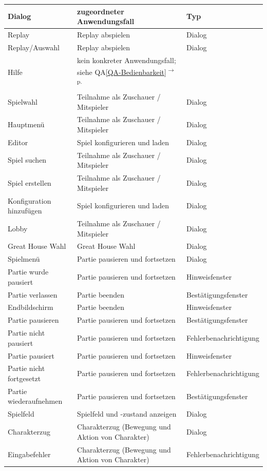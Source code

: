 \documentclass[12pt]{article}
\newcounter{fa}
\newcounter{nfa}
\newcommand{\nfaref}[1]{QA\ref{#1}\textsuperscript{$\rightarrow$ p. \pageref{#1}}}
\begin{document}
\begin{tabularx}{\linewidth}{p{4cm}|p{7cm}|l}
	\textbf{Dialog} & \textbf{zugeordneter Anwendungsfall} & Typ \\
	\hline
	Replay & Replay abspielen & Dialog \\
	Replay/Auswahl & Replay abspielen & Dialog \\
	Hilfe & kein konkreter Anwendungsfall; siehe \nfaref{QA-Bedienbarkeit} \\			Spielwahl & Teilnahme als Zuschauer / Mitspieler & Dialog \\
	Hauptmenü & Teilnahme als Zuschauer / Mitspieler & Dialog \\
	Editor & Spiel konfigurieren und laden & Dialog \\
	Spiel suchen & Teilnahme als Zuschauer / Mitspieler & Dialog \\
	Spiel erstellen & Teilnahme als Zuschauer / Mitspieler & Dialog \\
	Konfiguration hinzufügen & Spiel konfigurieren und laden & Dialog \\
	Lobby & Teilnahme als Zuschauer / Mitspieler & Dialog \\
	Great House Wahl & Great House Wahl & Dialog \\
	Spielmenü & Partie pausieren und fortsetzen & Dialog \\
	Partie wurde pausiert & Partie pausieren und fortsetzen & Hinweisfenster \\
	Partie verlassen & Partie beenden & Bestätigungsfenster \\
	Endbildschirm & Partie beenden & Hinweisfenster \\ 	
	Partie pausieren & Partie pausieren und fortsetzen & Bestätigungsfenster \\
	Partie nicht pausiert & Partie pausieren und fortsetzen & Fehlerbenachrichtigung \\		
	Partie pausiert & Partie pausieren und fortsetzen & Hinweisfenster \\	
	Partie nicht fortgesetzt & Partie pausieren und fortsetzen & Fehlerbenachrichtigung \\ 
	Partie wiederaufnehmen & Partie pausieren und fortsetzen & Bestätigungsfenster \\
	Spielfeld & Spielfeld und -zustand anzeigen & Dialog \\
	Charakterzug & Charakterzug (Bewegung und Aktion von Charakter) & Dialog \\ 
	Eingabefehler & Charakterzug (Bewegung und Aktion von Charakter) & Fehlerbenachrichtigung \\

\end{tabularx}
\end{document}
